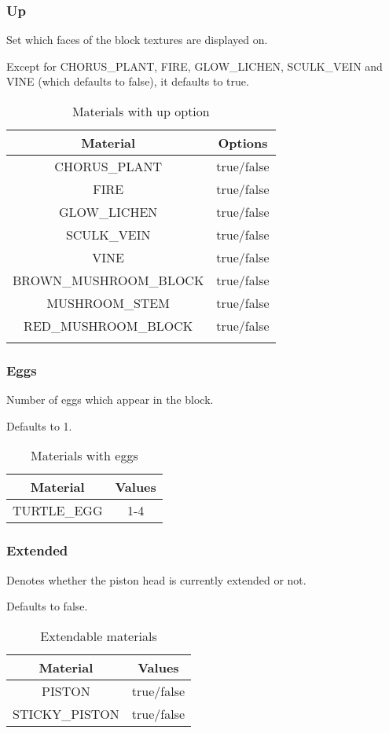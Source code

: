 \subsubsection{Up}
Set which faces of the block textures are displayed on.

Except for CHORUS\_PLANT, FIRE, GLOW\_LICHEN, SCULK\_VEIN and VINE (which defaults to false), it defaults to true.

\begin{longtable}{ |c|c| }
	\hline
	Material & Options \\
	\hline
	\endhead
	CHORUS\_PLANT & true/false \\
	FIRE & true/false \\
	GLOW\_LICHEN & true/false \\
	SCULK\_VEIN & true/false \\
	VINE & true/false \\
	\hline
	BROWN\_MUSHROOM\_BLOCK & true/false \\
	MUSHROOM\_STEM & true/false \\
	RED\_MUSHROOM\_BLOCK & true/false \\
	\hline
	\caption{Materials with up option}
\end{longtable}

\subsubsection{Eggs}
Number of eggs which appear in the block.

Defaults to 1.

\begin{table}[H]
	\centering
	\begin{tabular}{ |c|c| }
		\hline
		Material & Values \\
		\hline
		TURTLE\_EGG & 1-4 \\
		\hline
	\end{tabular}
	\caption{Materials with eggs}
\end{table}

\subsubsection{Extended}
Denotes whether the piston head is currently extended or not.

Defaults to false.

\begin{table}[H]
	\centering
	\begin{tabular}{ |c|c| }
		\hline
		Material & Values \\
		\hline
		PISTON & true/false \\
		STICKY\_PISTON & true/false \\
		\hline
	\end{tabular}
	\caption{Extendable materials}
\end{table}

